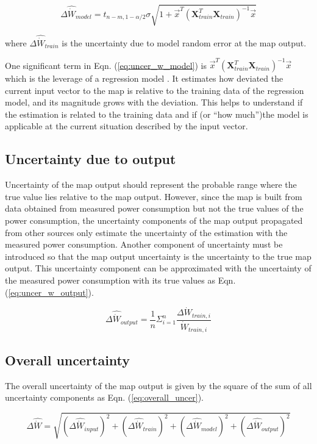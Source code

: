 \begin{equation}
\Delta {\hat{\dot{W}}_{model}} = {t_{n - m,1 - \alpha /2}}\sigma \sqrt {1 + {{\vec x}^T}{{({\mathbf{X}}_{train}^T{{\mathbf{X}}_{train}})}^{ - 1}}\vec x}
\label{eq:uncer_w_model}
\end{equation}

where $\Delta {\hat{\dot{W}}_{train}}$ is the uncertainty due to model random error at the map output.

One significant term in Eqn. (\ref{eq:uncer_w_model}) is ${\vec x^T}{({\mathbf{X}}_{train}^T{{\mathbf{X}}_{train}})^{ - 1}}\vec x$ which is the leverage of a regression model \cite{Atkinson:1987}. It estimates how deviated the current input vector to the map is relative to the training data of the regression model, and its magnitude grows with the deviation. This helps to understand if the estimation is related to the training data and if (or ``how much'')the model is applicable at the current situation described by the input vector.

\subsection{Uncertainty due to output} \label{subsec:uncer_output}

Uncertainty of the map output should represent the probable range where the true value lies relative to the map output. However, since the map is built from data obtained from measured power consumption but not the true values of the power consumption, the uncertainty components of the map output propagated from other sources only estimate the uncertainty of the estimation with the measured power consumption. Another component of uncertainty must be introduced so that the map output uncertainty is the uncertainty to the true map output. This uncertainty component can be approximated with the uncertainty of the measured power consumption with its true values as Eqn. (\ref{eq:uncer_w_output}).

\begin{equation}
\Delta {\hat{\dot{W}}_{output}} = \frac{1}{n}\Sigma _{i = 1}^n\frac{{\Delta {{\dot{W}}_{train,i}}}}{{{{\dot{W}}_{train,i}}}}
\label{eq:uncer_w_output}
\end{equation}

\subsection{Overall uncertainty} \label{subsec:overall_uncer}

The overall uncertainty of the map output is given by the square of the sum of all uncertainty components as Eqn. (\ref{eq:overall_uncer}).

\begin{equation}
\Delta \hat{\dot{W}}= \sqrt {{{(\Delta {{\hat{\dot{W}}}_{input}})}^2} + {{(\Delta {{\hat{\dot{W}}}_{train}})}^2} + {{(\Delta {{\hat{\dot{W}}}_{model}})}^2} + {{(\Delta {{\hat{\dot{W}}}_{output}})}^2}}
\label{eq:overall_uncer}
\end{equation}
